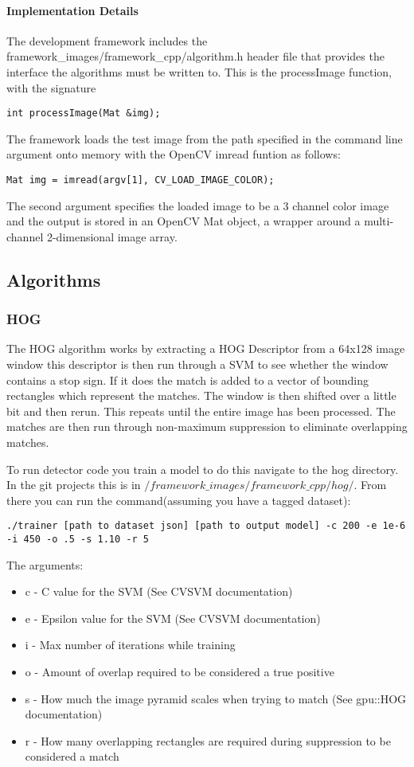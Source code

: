 \documentclass[letterpaper,10pt,titlepage]{article}
\begin{document}
\paragraph*{Implementation Details}
The development framework includes the
framework\_images/framework\_cpp/algorithm.h header file that provides the 
interface the algorithms must be written to. This is the processImage function,
with the signature
\begin{lstlisting}
int processImage(Mat &img);
\end{lstlisting}
The framework loads the test image from the path specified in the command line 
argument onto memory with the OpenCV imread funtion as follows:
\begin{lstlisting}
Mat img = imread(argv[1], CV_LOAD_IMAGE_COLOR);
\end{lstlisting}
The second argument specifies the loaded image to be a 3 channel color image
and the output is stored in an OpenCV Mat object, a wrapper around a 
multi-channel 2-dimensional image array.

\subsection*{Algorithms}

\subsubsection*{HOG}
The HOG algorithm works by extracting a HOG Descriptor from a 64x128 image window
this descriptor is then run through a SVM to see whether the window contains a 
stop sign. If it does the match is added to a vector of bounding rectangles which
represent the matches. The window is then shifted over a little bit and then rerun.
This repeats until the entire image has been processed. The matches are then run 
through non-maximum suppression to eliminate overlapping matches.

To run detector code you train a model to do this navigate to the hog directory. In
the git projects this is in $/framework\_images/framework\_cpp/hog/$. From there you can
run the command(assuming you have a tagged dataset):
\begin{lstlisting}
./trainer [path to dataset json] [path to output model] -c 200 -e 1e-6 -i 450 -o .5 -s 1.10 -r 5
\end{lstlisting}
The arguments:
\begin{itemize}
    \item c - C value for the SVM (See CVSVM documentation)
    \item e - Epsilon value for the SVM (See CVSVM documentation)
    \item i - Max number of iterations while training
    \item o - Amount of overlap required to be considered a true positive
    \item s - How much the image pyramid scales when trying to match (See gpu::HOG documentation)
    \item r - How many overlapping rectangles are required during suppression to be considered a match
\end{itemize}
\end{document}

